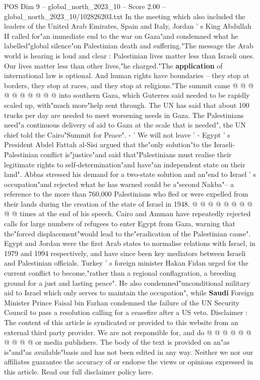 \begin{textsample}{POS Dim 9 – global\_north\_2023\_10 – Score 2.00 – global\_north\_2023\_10/102826203.txt}
In the meeting which also included the leaders of the United Arab Emirates, Spain and Italy, Jordan ' s King Abdullah II called for"an immediate end to the war on Gaza"and condemned what he labelled"global silence"on Palestinian death and suffering."The message the Arab world is hearing is loud and clear : Palestinian lives matter less than Israeli ones.
Our lives matter less than other lives,"he charged."The \textbf{application} of international law is optional.
And human rights have boundaries -- they stop at borders, they stop at races, and they stop at religions."The summit came @ @ @ @ @ @ @ @ @ @ into southern Gaza, which Guterres said needed to be rapidly scaled up, with"much more"help sent through.
The UN has said that about 100 trucks per day are needed to meet worsening needs in Gaza.
The Palestinians need"a continuous delivery of aid to Gaza at the scale that is needed", the UN chief told the Cairo"Summit for Peace". - ' We will not leave ' - Egypt ' s President Abdel Fattah al-Sisi argued that the"only solution"to the Israeli-Palestinian conflict is"justice"and said that"Palestinians must realise their legitimate rights to self-determination"and have"an independent state on their land".
Abbas stressed his demand for a two-state solution and an"end to Israel ' s occupation"and rejected what he has warned could be a"second Nakba"-- a reference to the more than 760,000 Palestinians who fled or were expelled from their lands during the creation of the state of Israel in 1948. @ @ @ @ @ @ @ @ @ @ times at the end of his speech.
Cairo and Amman have repeatedly rejected calls for large numbers of refugees to enter Egypt from Gaza, warning that the"forced displacement"would lead to the"eradication of the Palestinian cause".
Egypt and Jordan were the first Arab states to normalise relations with Israel, in 1979 and 1994 respectively, and have since been key mediators between Israeli and Palestinian officials.
Turkey ' s foreign minister Hakan Fidan urged for the current conflict to become,"rather than a regional conflagration, a breeding ground for a just and lasting peace".
He also condemned"unconditional military aid to Israel which only serves to maintain the occupation", while \textbf{Saudi} Foreign Minister Prince Faisal bin Farhan condemned the failure of the UN Security Council to pass a resolution calling for a ceasefire after a US veto.
Disclaimer : The content of this article is syndicated or provided to this website from an external third party provider.
We are not responsible for, and do @ @ @ @ @ @ @ @ @ @ or media publishers.
The body of the text is provided on an"as is"and"as available"basis and has not been edited in any way.
Neither we nor our affiliates guarantee the accuracy of or endorse the views or opinions expressed in this article.
Read our full disclaimer policy here.

\end{textsample}
